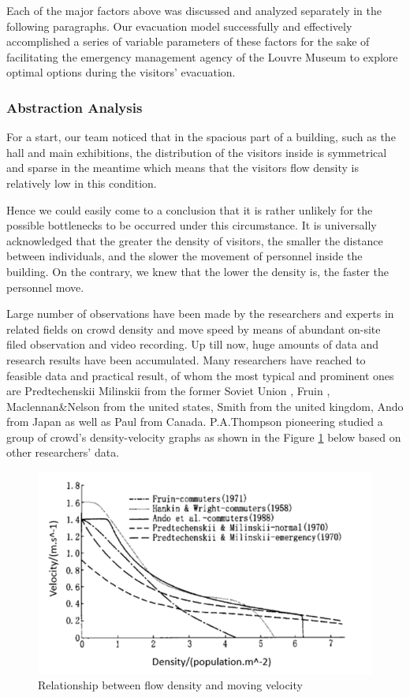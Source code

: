 \documentclass[12pt]{article}
\begin{document}
Each of the major factors above was discussed and analyzed separately in the 
following paragraphs. Our evacuation model  
successfully and effectively accomplished a series of variable 
parameters of these factors for the sake of facilitating the emergency management agency of the 
Louvre Museum to explore optimal options during the visitors' evacuation.


\subsubsection{Abstraction Analysis}

For a start, our team noticed that in the spacious part of a building, such as the hall and main exhibitions, the distribution of the visitors inside is symmetrical and sparse in the meantime which means that the visitors flow density is relatively low in this condition. 

Hence we could easily come to a conclusion that it is rather unlikely for the possible bottlenecks to be occurred under this circumstance. It is universally acknowledged that the greater the density of visitors, the smaller the distance between individuals, and the slower the movement of personnel inside the building. On the contrary, we knew that the lower the density is, the faster the personnel move. 

Large number of observations have been made by the researchers and experts in related fields on crowd density and move speed by means of abundant on-site filed observation and video recording. 
Up till now, huge amounts of data and research results have been accumulated. 
Many researchers have reached to feasible data and practical result, 
of whom the most typical and prominent ones are Predtechenskii Milinskii from the former Soviet Union\cite{7}
, Fruin , Maclennan\&Nelson from the united states\cite{8},
Smith from the united kingdom\cite{9},
Ando from Japan as well as Paul from Canada.
P.A.Thompson pioneering studied a group of crowd's density-velocity graphs as shown in the Figure \ref{fig:fig1} below based on other researchers' data.\cite{10}

\begin{figure}[htbp] 
	\centering
	\includegraphics[scale=0.6]{figure6.png}
	\caption{Relationship between flow density and moving velocity}
	\label{fig:fig1}
\end{figure}
\end{document}
